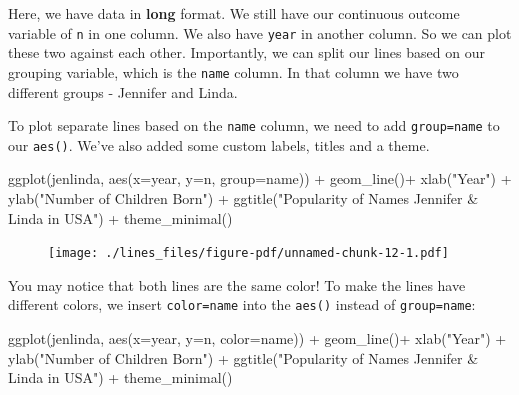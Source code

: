 \documentclass[
  letterpaper,
  DIV=11,
  numbers=noendperiod]{scrreprt}
\newenvironment{Shaded}{\begin{snugshade}}{\end{snugshade}}
\newcommand{\AttributeTok}[1]{\textcolor[rgb]{0.40,0.45,0.13}{#1}}
\newcommand{\FunctionTok}[1]{\textcolor[rgb]{0.28,0.35,0.67}{#1}}
\newcommand{\NormalTok}[1]{\textcolor[rgb]{0.00,0.23,0.31}{#1}}
\newcommand{\SpecialCharTok}[1]{\textcolor[rgb]{0.37,0.37,0.37}{#1}}
\newcommand{\StringTok}[1]{\textcolor[rgb]{0.13,0.47,0.30}{#1}}
\begin{document}
Here, we have data in \textbf{long} format. We still have our continuous
outcome variable of \texttt{n} in one column. We also have \texttt{year}
in another column. So we can plot these two against each other.
Importantly, we can split our lines based on our grouping variable,
which is the \texttt{name} column. In that column we have two different
groups - Jennifer and Linda.

To plot separate lines based on the \texttt{name} column, we need to add
\texttt{group=name} to our \texttt{aes()}. We've also added some custom
labels, titles and a theme.

\begin{Shaded}
\begin{Highlighting}[]
\FunctionTok{ggplot}\NormalTok{(jenlinda, }\FunctionTok{aes}\NormalTok{(}\AttributeTok{x=}\NormalTok{year, }\AttributeTok{y=}\NormalTok{n, }\AttributeTok{group=}\NormalTok{name)) }\SpecialCharTok{+} 
  \FunctionTok{geom\_line}\NormalTok{()}\SpecialCharTok{+}
  \FunctionTok{xlab}\NormalTok{(}\StringTok{"Year"}\NormalTok{) }\SpecialCharTok{+}
  \FunctionTok{ylab}\NormalTok{(}\StringTok{"Number of Children Born"}\NormalTok{) }\SpecialCharTok{+}
  \FunctionTok{ggtitle}\NormalTok{(}\StringTok{"Popularity of Names Jennifer \& Linda in USA"}\NormalTok{) }\SpecialCharTok{+}
  \FunctionTok{theme\_minimal}\NormalTok{()}
\end{Highlighting}
\end{Shaded}

\begin{figure}[H]

{\centering \texttt{[image: ./lines\_files/figure-pdf/unnamed-chunk-12-1.pdf]}

}

\end{figure}

You may notice that both lines are the same color! To make the lines
have different colors, we insert \texttt{color=name} into the
\texttt{aes()} instead of \texttt{group=name}:

\begin{Shaded}
\begin{Highlighting}[]
\FunctionTok{ggplot}\NormalTok{(jenlinda, }\FunctionTok{aes}\NormalTok{(}\AttributeTok{x=}\NormalTok{year, }\AttributeTok{y=}\NormalTok{n, }\AttributeTok{color=}\NormalTok{name)) }\SpecialCharTok{+} 
  \FunctionTok{geom\_line}\NormalTok{()}\SpecialCharTok{+}
  \FunctionTok{xlab}\NormalTok{(}\StringTok{"Year"}\NormalTok{) }\SpecialCharTok{+}
  \FunctionTok{ylab}\NormalTok{(}\StringTok{"Number of Children Born"}\NormalTok{) }\SpecialCharTok{+}
  \FunctionTok{ggtitle}\NormalTok{(}\StringTok{"Popularity of Names Jennifer \& Linda in USA"}\NormalTok{) }\SpecialCharTok{+}
  \FunctionTok{theme\_minimal}\NormalTok{()}
\end{Highlighting}
\end{Shaded}
\end{document}
